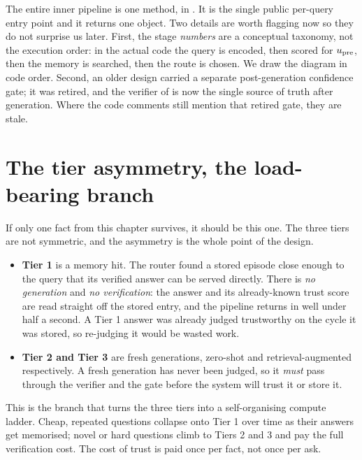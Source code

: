 \begin{fromcode}
The entire inner pipeline is one method,  in . It is the
single public per-query entry point and it returns one 
object. Two details are worth flagging now so they do not surprise us later.
First, the stage \emph{numbers} are a conceptual taxonomy, not the execution
order: in the actual code the query is encoded, then scored for $u_{\text{pre}}$, then the
memory is searched, then the route is chosen. We draw the diagram in code order.
Second, an older design carried a separate post-generation confidence gate; it
was retired, and the verifier of  is now the single source of
truth after generation. Where the code comments still mention that retired gate,
they are stale.
\end{fromcode}

\section{The tier asymmetry, the load-bearing branch}
\label{sec:tier-asymmetry}

If only one fact from this chapter survives, it should be this one. The three
tiers are not symmetric, and the asymmetry is the whole point of the design.

\begin{itemize}[leftmargin=1.4em]
  \item \textbf{Tier 1} is a memory hit. The router found a stored episode close
  enough to the query that its verified answer can be served directly. There is
  \emph{no generation} and \emph{no verification}: the answer and its
  already-known trust score are read straight off the stored entry, and the
  pipeline returns in well under half a second. A Tier 1 answer was already
  judged trustworthy on the cycle it was stored, so re-judging it would be wasted
  work.
  \item \textbf{Tier 2 and Tier 3} are fresh generations, zero-shot and
  retrieval-augmented respectively. A fresh generation has never been judged, so
  it \emph{must} pass through the verifier and the gate before the system will
  trust it or store it.
\end{itemize}

This is the branch that turns the three tiers into a self-organising compute
ladder. Cheap, repeated questions collapse onto Tier 1 over time as their answers
get memorised; novel or hard questions climb to Tiers 2 and 3 and pay the full
verification cost. The cost of trust is paid once per fact, not once per ask.


